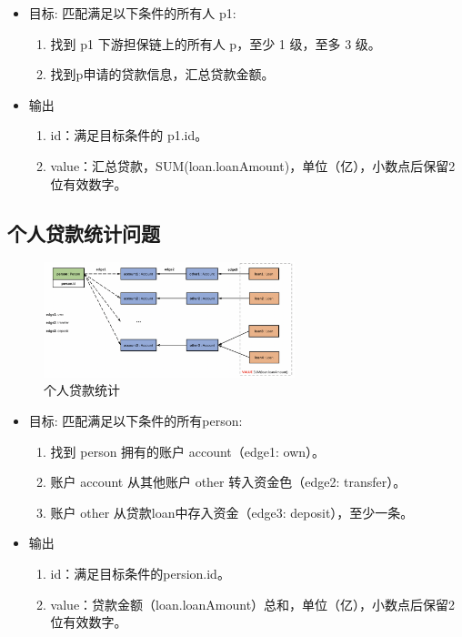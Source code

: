 \begin{itemize}
  \item 目标: 匹配满足以下条件的所有人 p1:
    \begin{enumerate}
      \item 找到 p1 下游担保链上的所有人 p，至少 1 级，至多 3 级。
      \item 找到p申请的贷款信息，汇总贷款⾦额。
    \end{enumerate}
  \item 输出
    \begin{enumerate}
      \item id：满足目标条件的 p1.id。
      \item value：汇总贷款，SUM(loan.loanAmount)，单位（亿），小数点后保留2位有效数字。
    \end{enumerate}
\end{itemize}

\subsection{个人贷款统计问题} \label{pro4}
\begin{figure}[H]
  \begin{center}
    \includegraphics[width=0.65\textwidth]{./figures/蚂蚁改4-331116.png}
  \end{center}
  \caption{个人贷款统计}
\end{figure}

\begin{itemize}
  \item 目标: 匹配满足以下条件的所有person:
    \begin{enumerate}
      \item 找到 person 拥有的账户 account（edge1: own）。
      \item 账户 account 从其他账户 other 转入资金色（edge2: transfer）。
      \item 账户 other 从贷款loan中存入资金（edge3: deposit），至少一条。
    \end{enumerate}
  \item 输出
    \begin{enumerate}
      \item id：满足目标条件的persion.id。
      \item value：贷款金额（loan.loanAmount）总和，单位（亿），小数点后保留2位有效数字。
    \end{enumerate}
\end{itemize}

